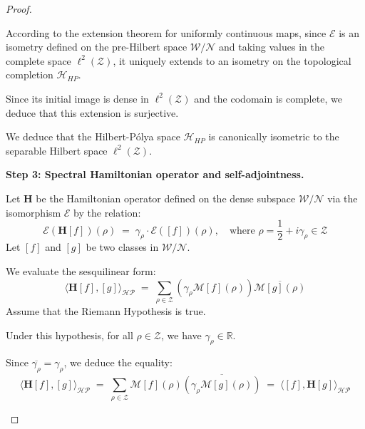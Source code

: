 \documentclass[Riemann_Hypothesis.tex]{subfiles}
\begin{document}
\begin{proof}
\begin{part_proof}
        According to the extension theorem for uniformly continuous maps, since $\mathcal{E}$ is an isometry defined on the pre-Hilbert space $\mathcal{W}/\mathcal{N}$ and taking values in the complete space $\ell^2(\mathcal{Z})$, it uniquely extends to an isometry on the topological completion $\mathcal{H}_{HP}$. \par
        Since its initial image is dense in $\ell^2(\mathcal{Z})$ and the codomain is complete, we deduce that this extension is surjective. \par
        We deduce that the Hilbert-Pólya space $\mathcal{H}_{HP}$ is canonically isometric to the separable Hilbert space $\ell^2(\mathcal{Z})$.
    \end{part_proof}

    \begin{part_proof}
        \textbf{Step 3: Spectral Hamiltonian operator and self-adjointness.} \par
        Let $\mathbf{H}$ be the Hamiltonian operator defined on the dense subspace $\mathcal{W} / \mathcal{N}$ via the isomorphism $\mathcal{E}$ by the relation:
        \begin{equation*}
            \mathcal{E}\left(\mathbf{H} [f]\right)(\rho) \;=\; \gamma_\rho \cdot \mathcal{E}([f])(\rho), \quad \text{where } \rho = \frac{1}{2} + i\gamma_\rho \in \mathcal{Z}
        \end{equation*}
        Let $[f]$ and $[g]$ be two classes in $\mathcal{W} / \mathcal{N}$. \par
        We evaluate the sesquilinear form:
        \begin{equation*}
            \langle \mathbf{H} [f], [g] \rangle_{\mathcal{HP}} \;=\; \sum_{\rho \in \mathcal{Z}} \left( \gamma_\rho \mathcal{M}[f](\rho) \right) \overline{\mathcal{M}[g](\rho)}
        \end{equation*}
        Assume that the Riemann Hypothesis is true. \par
        Under this hypothesis, for all $\rho \in \mathcal{Z}$, we have $\gamma_\rho \in \mathbb{R}$. \par
        Since $\overline{\gamma_\rho} = \gamma_\rho$, we deduce the equality:
        \begin{equation*}
            \langle \mathbf{H} [f], [g] \rangle_{\mathcal{HP}} \;=\; \sum_{\rho \in \mathcal{Z}} \mathcal{M}[f](\rho) \overline{\left( \gamma_\rho \mathcal{M}[g](\rho) \right)} \;=\; \langle [f], \mathbf{H} [g] \rangle_{\mathcal{HP}}
        \end{equation*}

\end{part_proof}
\end{proof}
\end{document}
